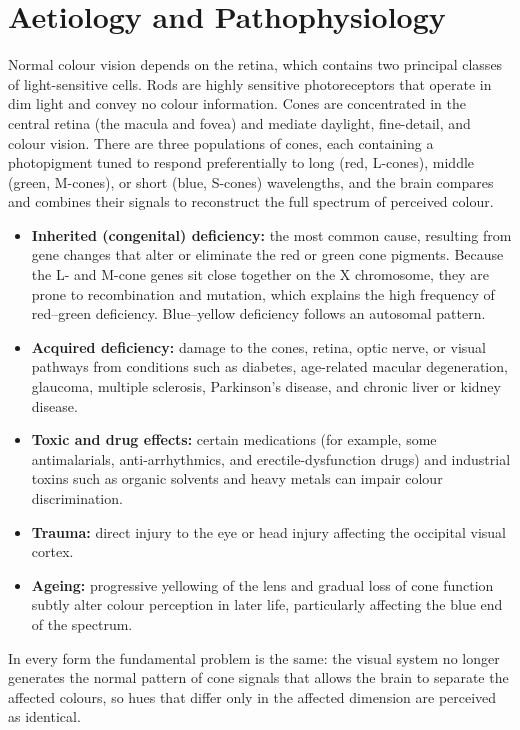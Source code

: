 \section*{Aetiology and Pathophysiology}
Normal colour vision depends on the retina, which contains two principal classes of light-sensitive cells. Rods are highly sensitive photoreceptors that operate in dim light and convey no colour information. Cones are concentrated in the central retina (the macula and fovea) and mediate daylight, fine-detail, and colour vision. There are three populations of cones, each containing a photopigment tuned to respond preferentially to long (red, L-cones), middle (green, M-cones), or short (blue, S-cones) wavelengths, and the brain compares and combines their signals to reconstruct the full spectrum of perceived colour.

\begin{itemize}
    \item \textbf{Inherited (congenital) deficiency:} the most common cause, resulting from gene changes that alter or eliminate the red or green cone pigments. Because the L- and M-cone genes sit close together on the X chromosome, they are prone to recombination and mutation, which explains the high frequency of red--green deficiency. Blue--yellow deficiency follows an autosomal pattern.
    \item \textbf{Acquired deficiency:} damage to the cones, retina, optic nerve, or visual pathways from conditions such as diabetes, age-related macular degeneration, glaucoma, multiple sclerosis, Parkinson's disease, and chronic liver or kidney disease.
    \item \textbf{Toxic and drug effects:} certain medications (for example, some antimalarials, anti-arrhythmics, and erectile-dysfunction drugs) and industrial toxins such as organic solvents and heavy metals can impair colour discrimination.
    \item \textbf{Trauma:} direct injury to the eye or head injury affecting the occipital visual cortex.
    \item \textbf{Ageing:} progressive yellowing of the lens and gradual loss of cone function subtly alter colour perception in later life, particularly affecting the blue end of the spectrum.
\end{itemize}

In every form the fundamental problem is the same: the visual system no longer generates the normal pattern of cone signals that allows the brain to separate the affected colours, so hues that differ only in the affected dimension are perceived as identical.

